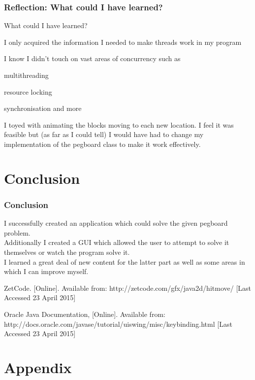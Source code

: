 \documentclass{beamer}
\begin{document}
	\begin{frame}
		\frametitle{Reflection: What could I have learned?}
		What could I have learned?
		\blt
			\item I only acquired the information I needed to make threads work in my program
			\item I know I didn't touch on vast areas of concurrency such as
			\blt
				\item multithreading
				\item resource locking
				\item synchronisation and more
			\finblt  
			\item I toyed with animating the blocks moving to each new location. I feel it was 
			feasible but (as far as I could tell) I would have had to change my implementation of the 
			pegboard class to make it work effectively. 
		\finblt
	\end{frame}
\section{Conclusion}	
	\begin{frame}
		\frametitle{Conclusion}
		I successfully created an application which could solve the given pegboard problem.\\\medskip
		Additionally I created a GUI which allowed the user to attempt to solve it themselves
		or watch the program solve it. \\\medskip
		I learned a great deal of new content for the latter part as well as some areas in which I can improve myself. 
		
		\bd{Resources Used:}
		\blt 
			\item ZetCode. [Online]. Available from: 
			http://zetcode.com/gfx/java2d/hitmove/ [Last Accessed 23 April 2015]

			\item Oracle Java Documentation, [Online]. Available from: 
			http://docs.oracle.com/javase/tutorial/uiswing/misc/keybinding.html [Last Accessed 23 April 2015]
		\finblt
	\end{frame}

\section{Appendix}
	
\end{document}
